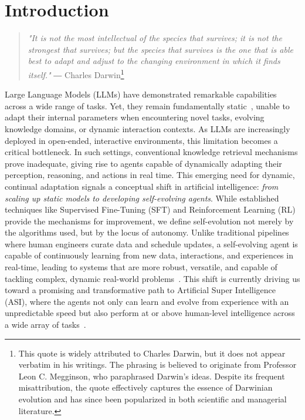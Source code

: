 \documentclass[10pt]{article} %
\begin{document}
\section{Introduction}

\begin{quote}
\textit{"It is not the most intellectual of the species that survives; it is not the strongest that survives; but the species that survives is the one that is able best to adapt and adjust to the changing environment in which it finds itself."}
\hspace{5cm} ― Charles Darwin\footnote{This quote is widely attributed to Charles Darwin, but it does not appear verbatim in his writings. The phrasing is believed to originate from Professor Leon C. Megginson, who paraphrased Darwin’s ideas. Despite its frequent misattribution, the quote effectively captures the essence of Darwinian evolution and has since been popularized in both scientific and managerial literature. } 
\end{quote}


Large Language Models (LLMs) have demonstrated remarkable capabilities across a wide range of tasks. Yet, they remain fundamentally static~\citep{luo2025largelanguagemodelagent}, unable to adapt their internal parameters when encountering novel tasks, evolving knowledge domains, or dynamic interaction contexts. As LLMs are increasingly deployed in open-ended, interactive environments, this limitation becomes a critical bottleneck. In such settings, conventional knowledge retrieval mechanisms prove inadequate, giving rise to agents capable of dynamically adapting their perception, reasoning, and actions in real time. This emerging need for dynamic, continual adaptation signals a conceptual shift in artificial intelligence: \textit{from scaling up static models to developing self-evolving agents}.
While established techniques like Supervised Fine-Tuning (SFT) and Reinforcement Learning (RL) provide the mechanisms for improvement, we define self-evolution not merely by the algorithms used, but by the locus of autonomy. Unlike traditional pipelines where human engineers curate data and schedule updates, a self-evolving agent is capable of continuously learning from new data, interactions, and experiences in real-time, leading to systems that are more robust, versatile, and capable of tackling complex, dynamic real-world problems~\citep{tool_tut}.
This shift is currently driving us toward a promising and transformative path to Artificial Super Intelligence (ASI), where the agents not only can learn and evolve from experience with an unpredictable speed but also perform at or above human-level intelligence across a wide array of tasks~\citep{wang2025theoryagentstoolusedecisionmakers}.
\end{document}
